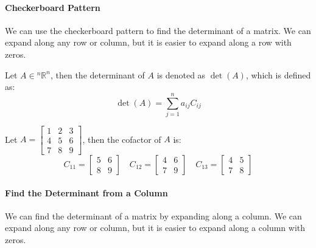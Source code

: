 \documentclass[11pt]{report}
\begin{document}
\paragraph{Checkerboard Pattern} We can use the checkerboard pattern to find the determinant of a matrix. We can expand along any row or column, but it is easier to expand along a row with zeros.
\begin{definition}[Determinant]
    Let $A \in  {^n\mathbb{R}^n}$, then the determinant of $A$ is denoted as $\det(A)$, which is defined as:
    \begin{equation}
        \det(A) = \sum_{j=1}^{n} a_{ij}C_{ij}
    \end{equation}
\end{definition}
\begin{example}
    Let $A = \begin{bmatrix} 1 & 2 & 3 \\ 4 & 5 & 6 \\ 7 & 8 & 9 \end{bmatrix}$, then the cofactor of $A$ is:
    $$ C_{11} = \begin{bmatrix} 5 & 6 \\ 8 & 9 \end{bmatrix} \quad C_{12} = \begin{bmatrix} 4 & 6 \\ 7 & 9 \end{bmatrix} \quad C_{13} = \begin{bmatrix} 4 & 5 \\ 7 & 8 \end{bmatrix} $$
\end{example}
\paragraph{Find the Determinant from a Column} We can find the determinant of a matrix by expanding along a column. We can expand along any row or column, but it is easier to expand along a column with zeros.
\end{document}
